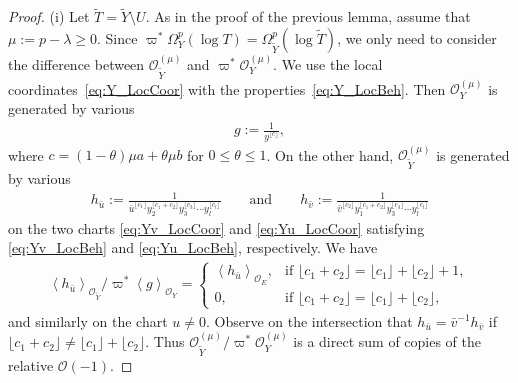 \documentclass[11pt]{article}
\newcommand{\sO}{\mathscr{O}}
\newcommand{\flr}[1]{\lfloor #1 \rfloor}
\newcommand{\gen}[1]{\left\langle #1 \right\rangle}
\begin{document}
\begin{proof}(i) Let $\widetilde{T} = \widetilde{Y}\setminus U$. As in the proof of the previous lemma, assume that $\mu:= p-\lambda \geq 0$. Since $\varpi^*\Omega_Y^p(\log T) = \Omega_{\widetilde{Y}}^p(\log \widetilde{T})$,
we only need to consider the difference between $\sO_{\widetilde{Y}}^{(\mu)}$ and $\varpi^*\sO_Y^{(\mu)}$. We use the local coordinates~\eqref{eq:Y_LocCoor} with the properties~\eqref{eq:Y_LocBeh}. Then $\sO_Y^{(\mu)}$ is generated by various
\begin{gather}\label{eq:g_Gen}g := \frac{1}{y^{\flr{c}}},\end{gather}
where $c = (1-\theta)\mu a + \theta\mu b$ for $0\leq\theta\leq 1$. On the other hand, $\sO_{\widetilde{Y}}^{(\mu)}$ is generated by various
\begin{gather*} h_{\bar{u}} := \frac{1}{\bar{u}^{\flr{c_1}}y_2^{\flr{c_1+c_2}}y_3^{\flr{c_3}}\cdots y_l^{\flr{c_l}}} \qquad\text{and}\qquad h_{\bar{v}} :=	\frac{1}{\bar{v}^{\flr{c_2}}y_1^{\flr{c_1+c_2}}y_3^{\flr{c_3}}
	\cdots y_l^{\flr{c_l}}} \end{gather*}
on the two charts \eqref{eq:Yv_LocCoor} and \eqref{eq:Yu_LocCoor} satisfying \eqref{eq:Yv_LocBeh} and \eqref{eq:Yu_LocBeh}, respectively. We have
\begin{gather*} \gen{h_{\bar{u}}}_{\sO_{\widetilde{Y}}}/\varpi^*\gen{g}_{\sO_Y} = \begin{cases}
\gen{h_{\bar{u}}}_{\sO_E}, & 	\text{if $\flr{c_1+c_2} = \flr{c_1} + \flr{c_2} + 1$}, \\
0, & \text{if $\flr{c_1+c_2} = \flr{c_1} + \flr{c_2}$},
\end{cases} \end{gather*}
and similarly on the chart $u\neq 0$. Observe on the intersection that $h_{\bar{u}} = \bar{v}^{-1}h_{\bar{v}}$ if $\flr{c_1+c_2} \neq \flr{c_1} + \flr{c_2}$. Thus $\sO_{\widetilde{Y}}^{(\mu)}/\varpi^*\sO_{Y}^{(\mu)}$
is a direct sum of copies of the relative $\sO(-1)$.


\end{proof}
\end{document}
